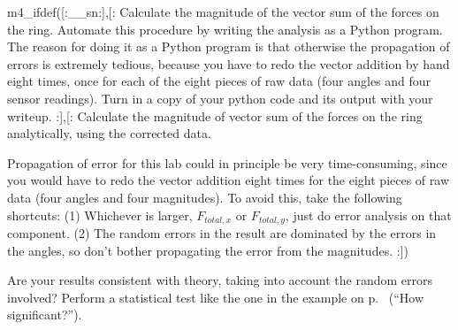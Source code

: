 \analysis

m4_ifdef([:__sn:],[:%
Calculate the magnitude of the vector sum of the forces on the
ring. Automate this procedure by writing the analysis as a Python program.
The reason for doing it as a Python program is that otherwise the propagation of errors
is extremely tedious, because you have to redo the vector addition by hand eight times,
once for each of the eight pieces of raw data (four angles and four sensor readings).
Turn in a copy of your python code and its output with your writeup. 
:],[:%
Calculate the magnitude of vector sum of the forces on the
ring analytically, using the corrected data.

Propagation of error for this lab could in principle be very time-consuming,
since you would have to redo the vector addition eight times for the eight
pieces of raw data (four angles and four magnitudes). 
To avoid this, take the following shortcuts: (1) Whichever is larger,
$F_{total,x}$ or $F_{total,y}$, just do error analysis on that component.
(2) The random errors in the result are dominated by the errors in the angles,
so don't bother propagating the error from the magnitudes.
:])

Are your results consistent with theory, taking into account
the random errors involved? Perform a statistical test like the
one in the example on p.~\pageref{eg:fine-structure} (``How significant?'').
